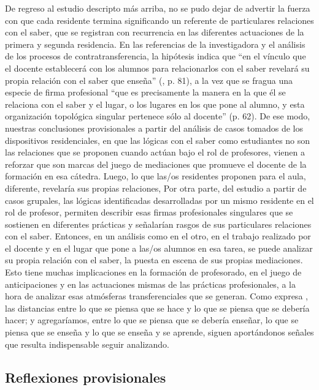 \documentclass[oneside,spanish]{amsart}
\numberwithin{equation}{section}
\numberwithin{figure}{section}
\theoremstyle{definition}
\begin{document}
De regreso al estudio descripto más arriba, no se pudo dejar de advertir la fuerza con que cada residente termina significando un referente de particulares relaciones con el saber, que se registran con recurrencia en las diferentes actuaciones de la primera y segunda residencia. En las referencias de la investigadora y el análisis de los procesos de contratransferencia, la hipótesis indica que “en el vínculo que el docente establecerá con los alumnos para relacionarlos con el saber revelará su propia relación con el saber que enseña” (\cite{laville04}, p. 81), a la vez que se fragua una especie de firma profesional “que es precisamente la manera en la que él se relaciona con el saber y el lugar, o los lugares en los que pone al alumno, y esta organización topológica singular pertenece sólo al docente” (p. 62). De ese modo, nuestras conclusiones provisionales a partir del análisis de casos tomados de los dispositivos residenciales, en que las lógicas con el saber como estudiantes no son las relaciones que se proponen cuando actúan bajo el rol de profesores, vienen a reforzar que son marcas del juego de mediaciones que promueve el docente de la formación en esa cátedra. Luego, lo que las/os residentes proponen para el aula, diferente, revelaría sus propias relaciones, Por otra parte, del estudio a partir de casos grupales, las lógicas identificadas desarrolladas por un mismo residente en el rol de profesor, permiten describir esas firmas profesionales singulares que se sostienen en diferentes prácticas y señalarían rasgos de sus particulares relaciones con el saber. Entonces, en un análisis como en el otro, en el trabajo realizado por el docente y en el lugar que pone a las/os alumnos en esa tarea, se puede analizar su propia relación con el saber, la puesta en escena de sus propias mediaciones. Esto tiene muchas implicaciones en la formación de profesorado, en el juego de anticipaciones y en las actuaciones mismas de las prácticas profesionales, a la hora de analizar esas atmósferas transferenciales que se generan. Como expresa \cite{planas11}, las distancias entre lo que se piensa que se hace y lo que se piensa que se debería hacer; y agregaríamos, entre lo que se piensa que se debería enseñar, lo que se piensa que se enseña y lo que se enseña y se aprende, siguen aportándonos señales que resulta indispensable seguir analizando.

\subsection{Reflexiones provisionales}
\end{document}
